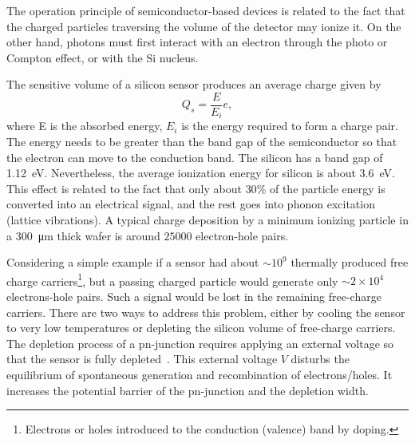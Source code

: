 The operation principle of semiconductor-based devices is related to the fact that the charged particles traversing the volume of the detector may ionize it. %
On the other hand, photons must first interact with an electron through the photo or Compton effect, or with the Si nucleus. 

The sensitive volume of a silicon sensor produces an average charge given by 
\begin{equation}
    Q_{s} = \frac{E}{E_{i}}e,
\end{equation}
where E is the absorbed energy, $E_{i}$ is the energy required to form a charge pair. The energy needs to be greater than the band gap of the semiconductor so that the electron can move to the conduction band. The silicon has a band gap of \SI{1.12}{\eV}. Nevertheless, the average ionization energy for silicon is about \SI{3.6}{\eV}. This effect is related to the fact that only about $30\%$ of the particle energy is converted into an electrical signal, and the rest goes into phonon excitation (lattice vibrations). A typical charge deposition by a minimum ionizing particle in a \SI{300}{\micro\metre} thick wafer is around $25000$ electron-hole pairs.

Considering a simple example if a sensor had about $\sim10^{9}$ thermally produced free charge carriers\footnote{Electrons or holes introduced to the conduction (valence) band by doping.}, but a passing charged particle would generate only $\sim2\times10^{4}$ electrons-hole pairs. Such a signal would be lost in the remaining free-charge carriers. There are two ways to address this problem, either by cooling the sensor to very low temperatures or depleting the silicon volume of free-charge carriers. The depletion process of a pn-junction requires applying an external voltage so that the sensor is fully depleted~\cite{Spieler}. This external voltage $V$ disturbs the equilibrium of spontaneous generation and recombination of electrons/holes. It increases the potential barrier of the pn-junction and the depletion width. 

